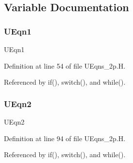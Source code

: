 \subsection{Variable Documentation}
\mbox{\label{UEqns__2p_8H_ac3b68d7f14e859dbaf0e8c9b850c0288}} 
\subsubsection{\texorpdfstring{U\+Eqn1}{UEqn1}}
{\footnotesize\ttfamily U\+Eqn1}



Definition at line 54 of file U\+Eqns\+\_\+2p.\+H.



Referenced by if(), switch(), and while().

\mbox{\label{UEqns__2p_8H_ab77d5a05bf95d2d48d8283c9d3567de7}} 
\subsubsection{\texorpdfstring{U\+Eqn2}{UEqn2}}
{\footnotesize\ttfamily U\+Eqn2}



Definition at line 94 of file U\+Eqns\+\_\+2p.\+H.



Referenced by if(), switch(), and while().

